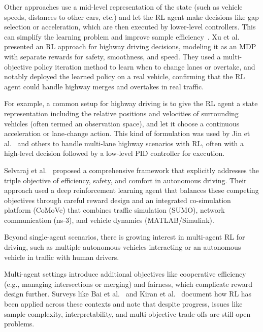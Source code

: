\documentclass[12pt,a4paper]{article}
\begin{document}
Other approaches use a mid-level representation of the state (such as vehicle speeds, distances to other cars, etc.) and let the RL agent make decisions like gap selection or acceleration, which are then executed by lower-level controllers. This can simplify the learning problem and improve sample efficiency~\cite{survey2023}. Xu et al.~\cite{xu2018} presented an RL approach for highway driving decisions, modeling it as an MDP with separate rewards for safety, smoothness, and speed. They used a multi-objective policy iteration method to learn when to change lanes or overtake, and notably deployed the learned policy on a real vehicle, confirming that the RL agent could handle highway merges and overtakes in real traffic.

For example, a common setup for highway driving is to give the RL agent a state representation including the relative positions and velocities of surrounding vehicles (often termed an observation space), and let it choose a continuous acceleration or lane-change action. This kind of formulation was used by Jin et al.~\cite{jin2025} and others to handle multi-lane highway scenarios with RL, often with a high-level decision followed by a low-level PID controller for execution.

Selvaraj et al.~\cite{selvaraj2023} proposed a comprehensive framework that explicitly addresses the triple objective of efficiency, safety, and comfort in autonomous driving. Their approach used a deep reinforcement learning agent that balances these competing objectives through careful reward design and an integrated co-simulation platform (CoMoVe) that combines traffic simulation (SUMO), network communication (ns-3), and vehicle dynamics (MATLAB/Simulink).

Beyond single-agent scenarios, there is growing interest in multi-agent RL for driving, such as multiple autonomous vehicles interacting or an autonomous vehicle in traffic with human drivers.

Multi-agent settings introduce additional objectives like cooperative efficiency (e.g., managing intersections or merging) and fairness, which complicate reward design further. Surveys like Bai et al.~\cite{survey2023} and Kiran et al.~\cite{kiran2022} document how RL has been applied across these contexts and note that despite progress, issues like sample complexity, interpretability, and multi-objective trade-offs are still open problems.
\end{document}
